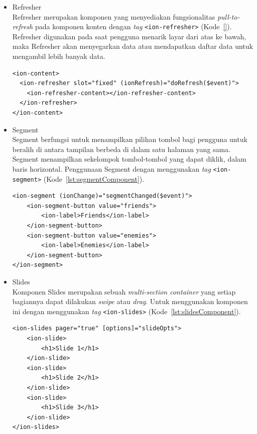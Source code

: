 \begin{itemize}
	\item Refresher \\
	Refresher merupakan komponen yang menyediakan fungsionalitas \textit{pull-to-refresh} pada komponen konten dengan \textit{tag} \texttt{<ion-refresher>} (Kode~\ref{}). Refresher digunakan pada saat pengguna menarik layar dari atas ke bawah, maka Refresher akan menyegarkan data atau mendapatkan daftar data untuk mengambil lebih banyak data. 
	
	\begin{lstlisting}[label={lst:segmentComponent}, caption=Kode Program dari Refresher]
<ion-content>
  <ion-refresher slot="fixed" (ionRefresh)="doRefresh($event)">
    <ion-refresher-content></ion-refresher-content>
  </ion-refresher>
</ion-content>
	\end{lstlisting}
	\item Segment \\
	Segment berfungsi untuk menampilkan pilihan tombol bagi pengguna untuk beralih di antara tampilan berbeda di dalam satu halaman yang sama. Segment menampilkan sekelompok tombol-tombol yang dapat diklik, dalam baris horizontal. Penggunaan Segment dengan menggunakan {\it tag} \texttt{<ion-segment>} (Kode~\ref{lst:segmentComponent}).
	
	\begin{lstlisting}[label={lst:segmentComponent}, caption=Kode Program dari Segment]
<ion-segment (ionChange)="segmentChanged($event)">
	<ion-segment-button value="friends">
		<ion-label>Friends</ion-label>
	</ion-segment-button>
	<ion-segment-button value="enemies">
		<ion-label>Enemies</ion-label>
	</ion-segment-button>
</ion-segment>
	\end{lstlisting}
	
	\item Slides \\
	Komponen Slides merupakan sebuah \textit{multi-section container} yang setiap bagiannya dapat dilakukan \textit{swipe} atau \textit{drag}. Untuk menggunakan komponen ini dengan menggunakan \textit{tag} \texttt{<ion-slides>} (Kode~\ref{lst:slidesComponent}).
	
	\begin{lstlisting}[label={lst:slidesComponent}, caption=Kode Program dari Slides]
<ion-slides pager="true" [options]="slideOpts">
	<ion-slide>
		<h1>Slide 1</h1>
	</ion-slide>
	<ion-slide>
		<h1>Slide 2</h1>
	</ion-slide>
	<ion-slide>
		<h1>Slide 3</h1>
	</ion-slide>
</ion-slides>
	\end{lstlisting}
	

\end{itemize}
